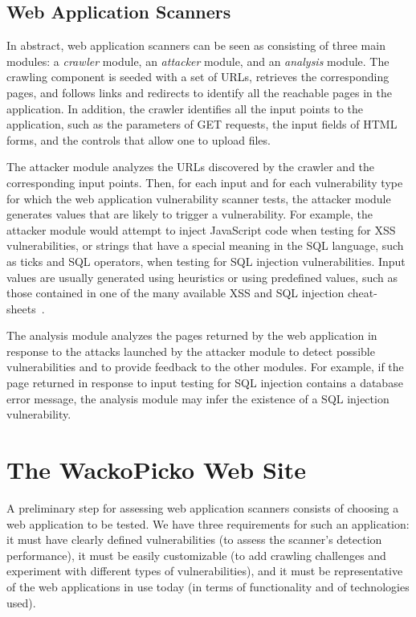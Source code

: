 \subsection{Web Application Scanners}

In abstract, web application scanners can be seen as consisting of three
main modules: a {\em crawler} module, an {\em attacker} module, and an {\em analysis} module.
The crawling component is seeded with a set of URLs,
retrieves the corresponding pages, and follows links and redirects to
identify all the reachable pages in the application.
In addition, the crawler identifies all the input points to the application,
such as the parameters of GET requests, the input fields of HTML forms,
and the controls that allow one to upload files.

The attacker module analyzes the URLs discovered by the crawler and the
corresponding input points. Then, for each input and for each
vulnerability type for which the web application vulnerability scanner
tests, the attacker module generates values
that are likely to trigger a vulnerability. For example,
the attacker module would attempt to inject JavaScript code when testing for XSS
vulnerabilities, or strings that have a special meaning in the SQL language, such as ticks and SQL operators, when testing for SQL
injection vulnerabilities.
Input values are usually generated using heuristics or using predefined
values, such as those contained in one of the many available XSS and
SQL injection
cheat-sheets~\cite{rsnake:sql_cheat_sheet,rsnake:xss_cheat_sheet}.

The analysis module analyzes the pages returned by the web application in
response to the attacks launched by the attacker module to detect possible
vulnerabilities and to provide feedback to the other modules.  For example, if
the page returned in response to input testing for SQL injection contains a
database error message, the analysis module may infer the existence of a SQL
injection vulnerability.



\section{The WackoPicko Web Site}

A preliminary step for assessing web application scanners consists of
choosing a web application to be tested. We have three requirements for
such an application: it must have clearly defined vulnerabilities (to
assess the scanner's detection performance), it must be easily
customizable (to add crawling challenges and experiment with different
types of vulnerabilities), and it must be representative of the web
applications in use today (in terms of functionality and of
technologies used).

